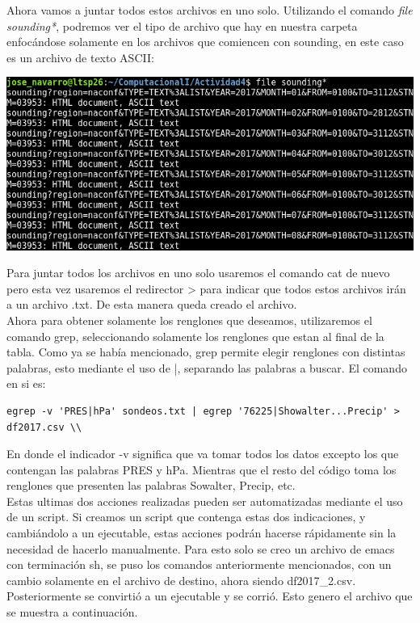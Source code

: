 \documentclass[12pt]{article}
\begin{document}
Ahora vamos a juntar todos estos archivos en uno solo. Utilizando el comando  \textit{ file sounding*}, podremos ver el tipo de archivo que hay en nuestra carpeta enfocándose solamente en los archivos que comiencen con sounding, en este caso es un archivo de texto ASCII:

\begin{center}
\includegraphics[scale=0.55]{ascii.png}
\end{center} 

Para juntar todos los archivos en uno solo usaremos el comando cat de nuevo pero esta vez usaremos el redirector > para indicar que todos estos archivos irán a un archivo .txt. De esta manera queda creado el archivo. \\

Ahora para obtener solamente los renglones que deseamos, utilizaremos el comando grep, seleccionando solamente los renglones que estan al final de la tabla. Como ya se había mencionado, grep permite elegir renglones con distintas palabras, esto mediante el uso de |, separando las palabras a buscar. El comando en si es:

\begin{verbatim}
egrep -v 'PRES|hPa' sondeos.txt | egrep '76225|Showalter...Precip' > df2017.csv \\
\end{verbatim}

En donde el indicador -v significa que va tomar todos los datos excepto los que contengan las palabras PRES y hPa. Mientras que el resto del código toma los renglones que presenten las palabras Sowalter, Precip, etc.\\

Estas ultimas dos acciones realizadas pueden ser automatizadas mediante el uso de un script. Si creamos un script que contenga estas dos indicaciones, y cambiándolo a un ejecutable, estas acciones podrán hacerse rápidamente sin la necesidad de hacerlo manualmente. Para esto solo se creo un archivo de emacs con terminación sh, se puso los comandos anteriormente mencionados, con un cambio solamente en el archivo de destino, ahora siendo df2017\_2.csv. Posteriormente se convirtió a un ejecutable y se corrió. Esto genero el archivo que se muestra a continuación. 
\end{document}
